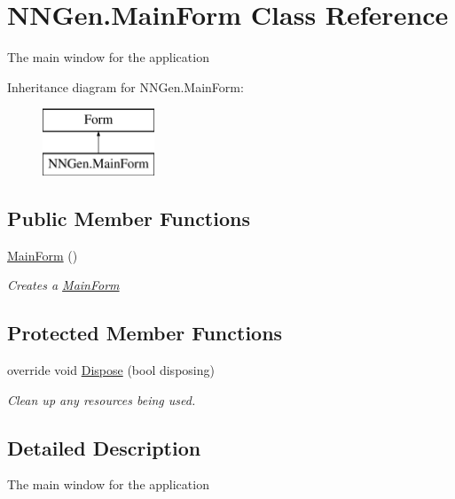 \hypertarget{class_n_n_gen_1_1_main_form}{}\section{N\+N\+Gen.\+Main\+Form Class Reference}
\label{class_n_n_gen_1_1_main_form}


The main window for the application  


Inheritance diagram for N\+N\+Gen.\+Main\+Form\+:\begin{figure}[H]
\begin{center}
\leavevmode
\includegraphics[height=2.000000cm]{class_n_n_gen_1_1_main_form}
\end{center}
\end{figure}
\subsection*{Public Member Functions}
\begin{DoxyCompactItemize}
\item 
\hyperlink{class_n_n_gen_1_1_main_form_a369d3b409380f302157457e6621badc9}{Main\+Form} ()
\begin{DoxyCompactList}\small\item\em Creates a \hyperlink{class_n_n_gen_1_1_main_form}{Main\+Form} \end{DoxyCompactList}\end{DoxyCompactItemize}
\subsection*{Protected Member Functions}
\begin{DoxyCompactItemize}
\item 
override void \hyperlink{class_n_n_gen_1_1_main_form_a9d1a2820f8c6e68cfe9a09d6fd4ca30f}{Dispose} (bool disposing)
\begin{DoxyCompactList}\small\item\em Clean up any resources being used. \end{DoxyCompactList}\end{DoxyCompactItemize}


\subsection{Detailed Description}
The main window for the application 



